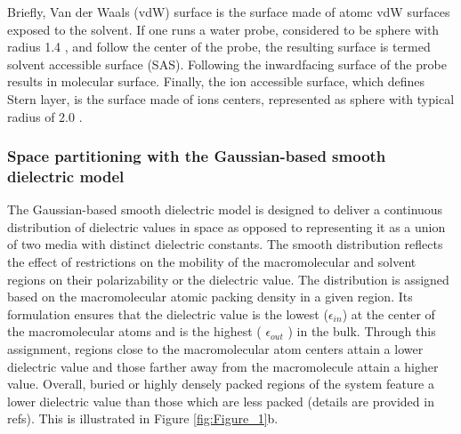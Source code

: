 \documentclass[9pt,tutorial]{livecoms}
\begin{document}
Briefly, Van der Waals (vdW) surface is the surface made of atomc vdW surfaces exposed to the solvent. If one runs a water probe, considered to be sphere with radius 1.4 \text{\AA}, and follow the center of the probe, the resulting surface is termed solvent accessible surface (SAS). Following the inward\textendash facing surface of the probe results in molecular surface. Finally, the ion accessible surface, which defines Stern layer, is the surface made of ions centers, represented as sphere with typical radius of 2.0 \text{\AA}.

\subsubsection{Space partitioning with the Gaussian-based smooth dielectric model}
The Gaussian-based smooth dielectric model is designed to deliver a continuous distribution of dielectric values in space as opposed to representing it as a union of two media with distinct dielectric constants. 
The smooth distribution reflects the effect of restrictions on the mobility of the macromolecular and solvent regions on their polarizability or the dielectric value. The distribution is assigned based on the macromolecular atomic packing density in a given region. Its formulation ensures that the dielectric value is the lowest ($ \epsilon_{in} $) at the center of the macromolecular atoms and is the highest ( $ \epsilon_{out} $ ) in the bulk. Through this assignment, regions close to the macromolecular atom centers attain a lower dielectric value and those farther away from the macromolecule attain a higher value. Overall, buried or highly densely packed regions of the system feature a lower dielectric value than those which are less packed (details are provided in refs\cite{chakravorty2019grid,decherchi2013between}). This is illustrated in Figure \ref{fig:Figure_1}b.
\end{document}

